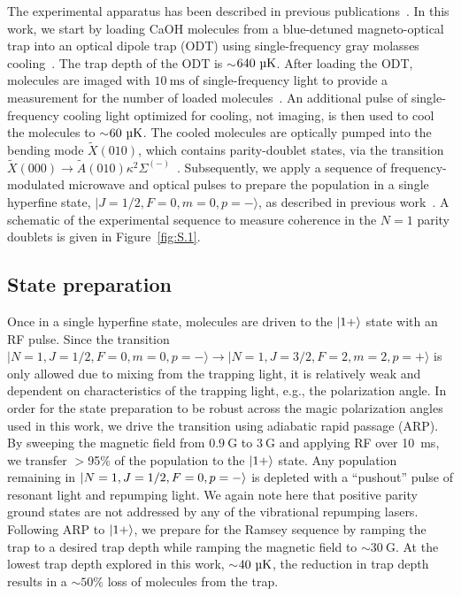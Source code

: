 \documentclass[
superscriptaddress,
twocolumn,
amsmath,amssymb,
aps,
prx,
nofootinbib,
]{revtex4-2}
\begin{document}
The experimental apparatus has been described in previous publications~\cite{vilas2022magneto}. In this work, we start by loading CaOH molecules from a blue-detuned magneto-optical trap into an optical dipole trap (ODT) using single-frequency gray molasses cooling~\cite{hallas2022optical, Hallas2024, vilas2025collisions}. The trap depth of the ODT is $\sim$$640~\text{\textmu K}$. After loading the ODT, molecules are imaged with $10~\text{ms}$ of single-frequency light to provide a measurement for the number of loaded molecules~\cite{hallas2022optical}. An additional pulse of single-frequency cooling light optimized for cooling, not imaging, is then used to cool the molecules to $\sim$$60~\text{\textmu K}$. The cooled molecules are optically pumped into the bending mode $\tilde{X}(010)$, which contains parity-doublet states, via the transition $\tilde{X}(000)\rightarrow\tilde{A}(010)\kappa^2\Sigma^{(-)}$~\cite{anderegg2023quantum}. Subsequently, we apply a sequence of frequency-modulated microwave and optical pulses to prepare the population in a single hyperfine state, $|J=1/2, F=0, m=0, p=-\rangle$, as described in previous work~\cite{anderegg2023quantum}. A schematic of the experimental sequence to measure coherence in the $N=1$ parity doublets is given in Figure~\ref{fig:S.1}.

\subsection{State preparation}

Once in a single hyperfine state, molecules are driven to the $\ket{1+}$ state with an RF pulse. Since the transition $|N=1, J=1/2, F=0, m=0, p=-\rangle \rightarrow |N=1, J=3/2, F=2, m=2, p=+\rangle$ is only allowed due to mixing from the trapping light, it is relatively weak and dependent on characteristics of the trapping light, e.g., the polarization angle. In order for the state preparation to be robust across the magic polarization angles used in this work, we drive the transition using adiabatic rapid passage (ARP). By sweeping the magnetic field from $0.9~\text{G}$ to $3~\text{G}$ and applying RF over 10~ms, we transfer $>$95\% of the population to the $\ket{1+}$ state. Any population remaining in $\ket{N=1, J=1/2, F=0, p=-}$ is depleted with a ``pushout'' pulse of resonant light and repumping light. We again note here that positive parity ground states are not addressed by any of the vibrational repumping lasers. Following ARP to $\ket{1+}$, we prepare for the Ramsey sequence by ramping the trap to a desired trap depth while ramping the magnetic field to $\sim30~\text{G}$. At the lowest trap depth explored in this work, $\sim$$40~\text{\textmu K}$, the reduction in trap depth results in a $\sim$$50\%$ loss of molecules from the trap.
\end{document}
